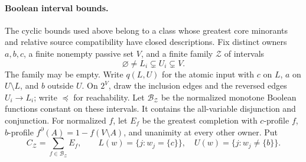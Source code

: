 \paragraph{Boolean interval bounds.}
The cyclic bounds used above belong to a class whose greatest core
minorants and relative source compatibility have closed descriptions.
Fix distinct owners $a,b,c$, a finite nonempty passive set $V$, and a
finite family $\mathcal Z$ of intervals
\[
 \varnothing\ne L_i\subsetneq U_i\subsetneq V.
\]
The family may be empty. Write $q(L,U)$ for the atomic input with
$c$ on $L$, $a$ on $U\setminus L$, and $b$ outside $U$.
On $2^V$, draw the inclusion edges and the reversed edges $U_i\to L_i$;
write $\preceq$ for reachability. Let $\mathcal B_{\mathcal Z}$ be the
normalized monotone Boolean functions constant on these intervals.
It contains the all-variable disjunction and conjunction.
For normalized $f$, let $E_f$ be the greatest completion with
$c$-profile $f$, $b$-profile $f^\partial(A)=1-f(V\setminus A)$,
and unanimity at every other owner. Put
\[
 C_{\mathcal Z}=\sum_{f\in\mathcal B_{\mathcal Z}}E_f,
 \qquad L(w)=\{j:w_j=\{c\}\},\quad U(w)=\{j:w_j\ne\{b\}\}.
\]

